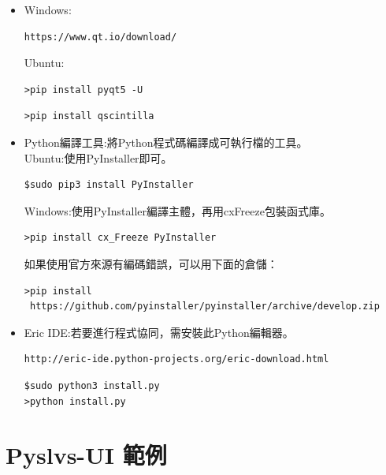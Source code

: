 \documentclass[14pt,a4paper]{report}  %
\begin{document}
     \begin{itemize}
		\item Windows:
		\begin{lstlisting}[caption=下載Qt檔]
https://www.qt.io/download/
		\end{lstlisting}
		Ubuntu:\\
		\begin{lstlisting}[caption=使用pip安裝PyQt5]
>pip install pyqt5 -U
		\end{lstlisting}
		\begin{lstlisting}[caption=使用pip安裝QScintilla 2]
>pip install qscintilla
		\end{lstlisting}
		\end{itemize} 
		      
     \begin{itemize}
		\item Python編譯工具:將Python程式碼編譯成可執行檔的工具。
		\hspace*{\fill} \\
		Ubuntu:使用PyInstaller即可。
		\begin{lstlisting}[caption=安裝PyInstaller]
$sudo pip3 install PyInstaller
		\end{lstlisting}
		Windows:使用PyInstaller編譯主體，再用cxFreeze包裝函式庫。\\
		\begin{lstlisting}[caption=安裝cxFreeze]
>pip install cx_Freeze PyInstaller
		\end{lstlisting}
		如果使用官方來源有編碼錯誤，可以用下面的倉儲：
		\begin{lstlisting}[caption=下載倉儲]
>pip install
 https://github.com/pyinstaller/pyinstaller/archive/develop.zip
		\end{lstlisting}
		\end{itemize} 
		
	\begin{itemize}
		\item Eric IDE:若要進行程式協同，需安裝此Python編輯器。
		\begin{lstlisting}[caption=下載Eric IDE]
http://eric-ide.python-projects.org/eric-download.html
		\end{lstlisting}
		\begin{lstlisting}[caption=執行install.py]
$sudo python3 install.py
>python install.py
		\end{lstlisting}
		\end{itemize}
       

      
    
      \section{Pyslvs-UI 範例}
\end{document}
